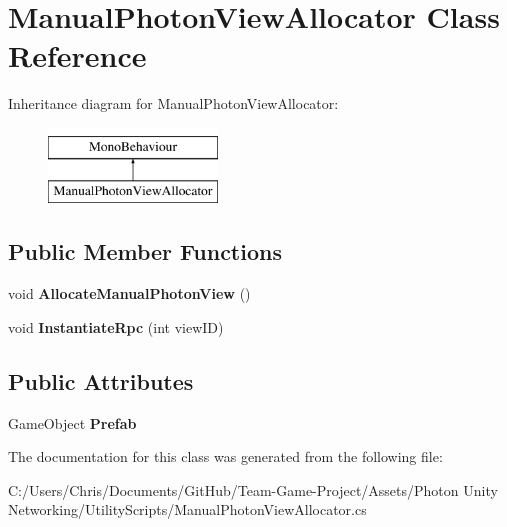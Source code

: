 \hypertarget{class_manual_photon_view_allocator}{}\section{Manual\+Photon\+View\+Allocator Class Reference}
\label{class_manual_photon_view_allocator}
Inheritance diagram for Manual\+Photon\+View\+Allocator\+:\begin{figure}[H]
\begin{center}
\leavevmode
\includegraphics[height=2.000000cm]{class_manual_photon_view_allocator}
\end{center}
\end{figure}
\subsection*{Public Member Functions}
\begin{DoxyCompactItemize}
\item 
void {\bfseries Allocate\+Manual\+Photon\+View} ()\hypertarget{class_manual_photon_view_allocator_a8a0cd5af4b8c807c81d3d3bbdb07d78a}{}\label{class_manual_photon_view_allocator_a8a0cd5af4b8c807c81d3d3bbdb07d78a}

\item 
void {\bfseries Instantiate\+Rpc} (int view\+ID)\hypertarget{class_manual_photon_view_allocator_ac7091a7bd0abf0ad38fe4b42b501b9a4}{}\label{class_manual_photon_view_allocator_ac7091a7bd0abf0ad38fe4b42b501b9a4}

\end{DoxyCompactItemize}
\subsection*{Public Attributes}
\begin{DoxyCompactItemize}
\item 
Game\+Object {\bfseries Prefab}\hypertarget{class_manual_photon_view_allocator_a52b754e26b5972eb97a7645789c7f393}{}\label{class_manual_photon_view_allocator_a52b754e26b5972eb97a7645789c7f393}

\end{DoxyCompactItemize}


The documentation for this class was generated from the following file\+:\begin{DoxyCompactItemize}
\item 
C\+:/\+Users/\+Chris/\+Documents/\+Git\+Hub/\+Team-\/\+Game-\/\+Project/\+Assets/\+Photon Unity Networking/\+Utility\+Scripts/Manual\+Photon\+View\+Allocator.\+cs\end{DoxyCompactItemize}
